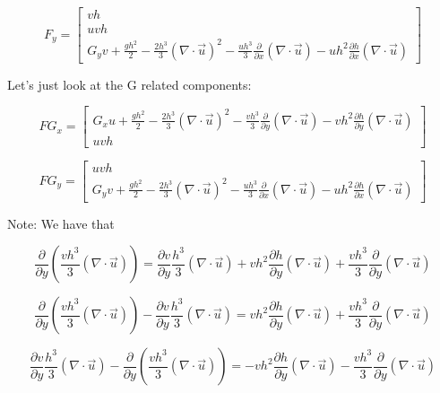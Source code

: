 \documentclass[12pt]{article}
\begin{document}
\[F_y = \left[\begin{array}{c}
vh \\
uvh\\
G_yv+ \frac{gh^2}{2} - \frac{2h^3}{3}\left(\nabla \cdot \vec{u}\right)^2 - \frac{uh^3}{3}\frac{\partial}{\partial x}\left(\nabla \cdot \vec{u}\right) - uh^2\frac{\partial h}{\partial x} \left(\nabla \cdot \vec{u}\right)
\end{array}\right] \]

Let's just look at the G  related components:

\[FG_x = \left[\begin{array}{c}
G_xu + \frac{gh^2}{2} - \frac{2h^3}{3}\left(\nabla \cdot \vec{u}\right)^2 - \frac{vh^3}{3}\frac{\partial}{\partial y}\left(\nabla \cdot \vec{u}\right) - vh^2\frac{\partial h}{\partial y} \left(\nabla \cdot \vec{u}\right) \\
uvh
\end{array}\right] \]

\[FG_y = \left[\begin{array}{c}
uvh\\
G_yv+ \frac{gh^2}{2} - \frac{2h^3}{3}\left(\nabla \cdot \vec{u}\right)^2 - \frac{uh^3}{3}\frac{\partial}{\partial x}\left(\nabla \cdot \vec{u}\right) - uh^2\frac{\partial h}{\partial x} \left(\nabla \cdot \vec{u}\right)
\end{array}\right] \]



Note: We have that

\[\frac{\partial}{\partial y}\left(\frac{vh^3}{3} \left(\nabla \cdot \vec{u}\right)\right) = \frac{\partial v}{\partial y}\frac{h^3}{3} \left(\nabla \cdot \vec{u}\right) + vh^2\frac{\partial h}{\partial y}\left(\nabla \cdot \vec{u}\right) + \frac{vh^3}{3} \frac{\partial }{\partial y} \left(\nabla \cdot \vec{u}\right)   \]

\[\frac{\partial}{\partial y}\left(\frac{vh^3}{3} \left(\nabla \cdot \vec{u}\right)\right)  - \frac{\partial v}{\partial y}\frac{h^3}{3} \left(\nabla \cdot \vec{u}\right) = vh^2\frac{\partial h}{\partial y}\left(\nabla \cdot \vec{u}\right) + \frac{vh^3}{3} \frac{\partial }{\partial y} \left(\nabla \cdot \vec{u}\right)   \]

\[ \frac{\partial v}{\partial y}\frac{h^3}{3} \left(\nabla \cdot \vec{u}\right) - \frac{\partial}{\partial y}\left(\frac{vh^3}{3} \left(\nabla \cdot \vec{u}\right)\right) = -vh^2\frac{\partial h}{\partial y}\left(\nabla \cdot \vec{u}\right) - \frac{vh^3}{3} \frac{\partial }{\partial y} \left(\nabla \cdot \vec{u}\right)   \]
\end{document}
